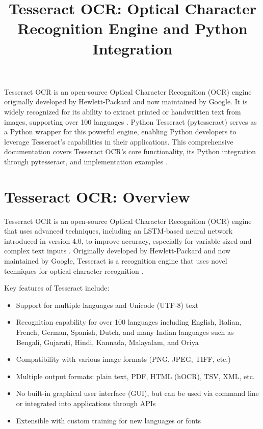 \documentclass{article}
\title{Tesseract OCR: Optical Character Recognition Engine and Python Integration}
\author{}
\date{}
\begin{document}
	
	\maketitle
	
	Tesseract OCR is an open-source Optical Character Recognition (OCR) engine originally developed by Hewlett-Packard and now maintained by Google. It is widely recognized for its ability to extract printed or handwritten text from images, supporting over 100 languages \cite {Betterpath:2023}. Python Tesseract (pytesseract) serves as a Python wrapper for this powerful engine, enabling Python developers to leverage Tesseract's capabilities in their applications. This comprehensive documentation covers Tesseract OCR's core functionality, its Python integration through pytesseract, and implementation examples \cite {Nutrient:2025}.
	
	\section{Tesseract OCR: Overview}
	
	Tesseract OCR is an open-source Optical Character Recognition (OCR) engine that uses advanced techniques, including an LSTM-based neural network introduced in version 4.0, to improve accuracy, especially for variable-sized and complex text inputs \cite {Betterpath:2023, DataCamp:2024}. Originally developed by Hewlett-Packard and now maintained by Google, Tesseract is a recognition engine that uses novel techniques for optical character recognition \cite {Joshi:2021}.
	
	Key features of Tesseract include:
	\begin{itemize}
		\item Support for multiple languages and Unicode (UTF-8) text
		\item Recognition capability for over 100 languages including English, Italian, French, German, Spanish, Dutch, and many Indian languages such as Bengali, Gujarati, Hindi, Kannada, Malayalam, and Oriya \cite {Joshi:2021}
		\item Compatibility with various image formats (PNG, JPEG, TIFF, etc.)
		\item Multiple output formats: plain text, PDF, HTML (hOCR), TSV, XML, etc.
		\item No built-in graphical user interface (GUI), but can be used via command line or integrated into applications through APIs
		\item Extensible with custom training for new languages or fonts
	\end{itemize}
	
\end{document}
